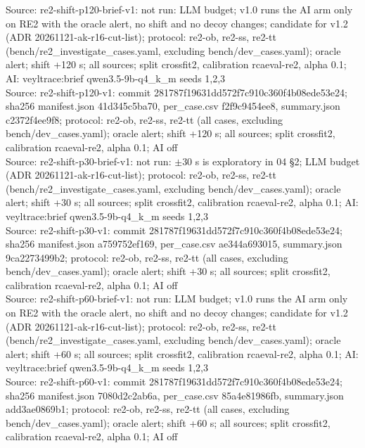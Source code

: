 \begin{table}[t]
Source: re2-shift-p120-brief-v1: not run: LLM budget; v1.0 runs the AI arm only on RE2 with the oracle alert, no shift and no decoy changes; candidate for v1.2 (ADR 20261121-ak-r16-cut-list); protocol: re2-ob, re2-ss, re2-tt (bench/re2\_investigate\_cases.yaml, excluding bench/dev\_cases.yaml); oracle alert; shift +120 s; all sources; split crossfit2, calibration rcaeval-re2, alpha 0.1; AI: veyltrace:brief qwen3.5-9b-q4\_k\_m seeds 1,2,3\\
Source: re2-shift-p120-v1: commit 281787f19631dd572f7c910c360f4b08ede53e24; sha256 manifest.json 41d345c5ba70, per\_case.csv f2f9c9454ee8, summary.json c2372f4ee9f8; protocol: re2-ob, re2-ss, re2-tt (all cases, excluding bench/dev\_cases.yaml); oracle alert; shift +120 s; all sources; split crossfit2, calibration rcaeval-re2, alpha 0.1; AI off\\
Source: re2-shift-p30-brief-v1: not run: $\pm$30 s is exploratory in 04 \S{}2; LLM budget (ADR 20261121-ak-r16-cut-list); protocol: re2-ob, re2-ss, re2-tt (bench/re2\_investigate\_cases.yaml, excluding bench/dev\_cases.yaml); oracle alert; shift +30 s; all sources; split crossfit2, calibration rcaeval-re2, alpha 0.1; AI: veyltrace:brief qwen3.5-9b-q4\_k\_m seeds 1,2,3\\
Source: re2-shift-p30-v1: commit 281787f19631dd572f7c910c360f4b08ede53e24; sha256 manifest.json a759752ef169, per\_case.csv ae344a693015, summary.json 9ca2273499b2; protocol: re2-ob, re2-ss, re2-tt (all cases, excluding bench/dev\_cases.yaml); oracle alert; shift +30 s; all sources; split crossfit2, calibration rcaeval-re2, alpha 0.1; AI off\\
Source: re2-shift-p60-brief-v1: not run: LLM budget; v1.0 runs the AI arm only on RE2 with the oracle alert, no shift and no decoy changes; candidate for v1.2 (ADR 20261121-ak-r16-cut-list); protocol: re2-ob, re2-ss, re2-tt (bench/re2\_investigate\_cases.yaml, excluding bench/dev\_cases.yaml); oracle alert; shift +60 s; all sources; split crossfit2, calibration rcaeval-re2, alpha 0.1; AI: veyltrace:brief qwen3.5-9b-q4\_k\_m seeds 1,2,3\\
Source: re2-shift-p60-v1: commit 281787f19631dd572f7c910c360f4b08ede53e24; sha256 manifest.json 7080d2c2ab6a, per\_case.csv 85a4e81986fb, summary.json add3ae0869b1; protocol: re2-ob, re2-ss, re2-tt (all cases, excluding bench/dev\_cases.yaml); oracle alert; shift +60 s; all sources; split crossfit2, calibration rcaeval-re2, alpha 0.1; AI off\\
\end{table}
